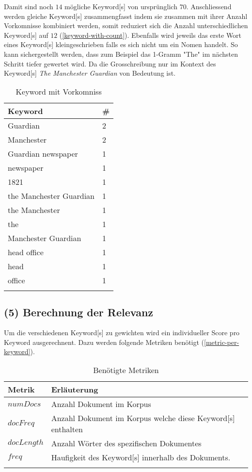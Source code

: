 Damit sind noch $14$ mögliche \gls{Keyword}[s] von ursprünglich $70$. Anschliessend werden gleiche \gls{Keyword}[s] zusammengfasst indem sie zusammen mit ihrer Anzahl Vorkomnisse kombiniert werden, somit reduziert sich die Anzahl unterschiedlichen \gls{Keyword}[s] auf $12$ (\autoref{keyword-with-count}). Ebenfalls wird jeweils das erste Wort eines \gls{Keyword}[s] kleingeschrieben falls es sich nicht um ein Nomen handelt. So kann sichergestellt werden, dass zum Beispiel das 1-Gramm "The" im nächsten Schritt tiefer gewertet wird. Da die Grosschreibung nur im Kontext des \gls{Keyword}[s] \textit{The Manchester Guardian} von Bedeutung ist.

\begin{longtable}{|p{4cm}| p{1cm}|}
  \hline
    \gls{Keyword} & \#\\\hline
    Guardian & 2  \\\hline
    Manchester & 2  \\\hline
    Guardian newspaper & 1  \\\hline
    newspaper & 1  \\\hline
    1821 & 1  \\\hline
    the Manchester Guardian & 1  \\\hline
    the Manchester & 1  \\\hline
    the & 1  \\\hline
    Manchester Guardian & 1  \\\hline
    head office & 1  \\\hline
    head & 1  \\\hline
    office & 1  \\\hline
        \caption{Keyword mit Vorkomniss}
    \label{keyword-with-count}
\end{longtable}

\subsection{(5) Berechnung der Relevanz}\label{calcrelevance}
Um die verschiedenen \gls{Keyword}[s] zu gewichten wird ein individueller Score pro \gls{Keyword} ausgerechnent. Dazu werden folgende Metriken benötigt (\autoref{metric-per-keyword}).

\begin{longtable}{|p{2cm}| p{8cm}|}
  \hline
    Metrik & Erläuterung\\\hline
    $numDocs$ & Anzahl Dokument im Korpus  \\\hline
    $docFreq$ & Anzahl Dokument im Korpus welche diese \gls{Keyword}[s] enthalten  \\\hline
    $docLength$ & Anzahl Wörter des spezifischen Dokumentes \\\hline
    $freq$ & Haufigkeit des \gls{Keyword}[s] innerhalb des Dokuments. \\\hline
    \caption{Benötigte Metriken}
    \label{metric-per-keyword}
\end{longtable}


